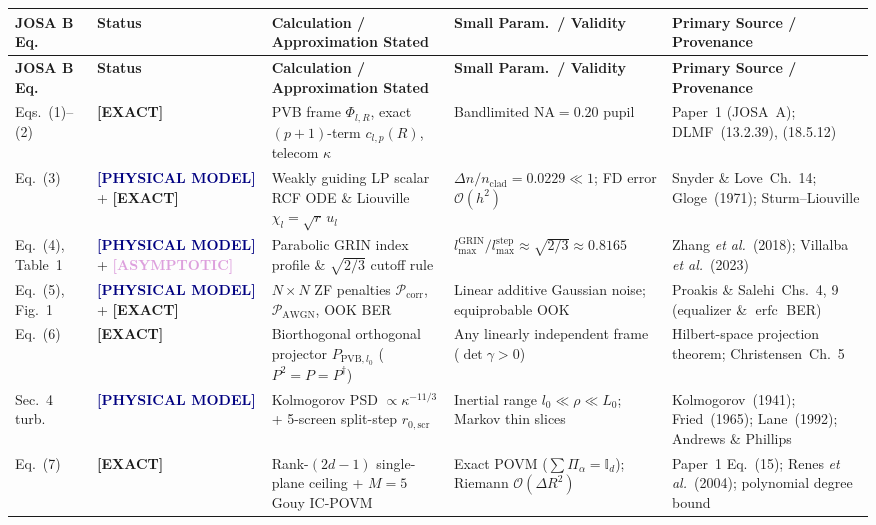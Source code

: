 \documentclass[10pt,letterpaper]{article}
\newcommand{\tagexact}{\textcolor{forest}{\textbf{[EXACT]}}}
\newcommand{\tagmodel}{\textcolor{navy}{\textbf{[PHYSICAL MODEL]}}}
\newcommand{\tagasymp}{\textcolor{plum}{\textbf{[ASYMPTOTIC]}}}
\numberwithin{equation}{section}
\begin{document}
\begin{center}
\scriptsize
\renewcommand{\arraystretch}{1.18}
\setlength{\tabcolsep}{3.5pt}
\begin{longtable}{@{}p{1.5cm}p{2.05cm}p{4.3cm}p{3.6cm}p{4.1cm}@{}}
\toprule
\textbf{JOSA B Eq.} & \textbf{Status} & \textbf{Calculation / Approximation Stated} & \textbf{Small Param.\ / Validity} & \textbf{Primary Source / Provenance} \\
\midrule
\endfirsthead
\toprule
\textbf{JOSA B Eq.} & \textbf{Status} & \textbf{Calculation / Approximation Stated} & \textbf{Small Param.\ / Validity} & \textbf{Primary Source / Provenance} \\
\midrule
\endhead
\bottomrule
\endfoot
Eqs.~(1)--(2) & \tagexact{} & PVB frame $\Phi_{l,R}$, exact $(p+1)$-term $c_{l,p}(R)$, telecom $\kappa$ & Bandlimited $\mathrm{NA} = 0.20$ pupil & Paper~1 (JOSA~A); DLMF~(13.2.39), (18.5.12) \\
Eq.~(3) & \tagmodel{} + \tagexact{} & Weakly guiding LP scalar RCF ODE \& Liouville $\chi_l = \sqrt{r}\,u_l$ & $\Delta n/n_{\mathrm{clad}} = 0.0229 \ll 1$; FD error $\mathcal{O}(h^2)$ & Snyder \& Love~Ch.~14; Gloge~(1971); Sturm--Liouville \\
Eq.~(4), Table~1 & \tagmodel{} + \tagasymp{} & Parabolic GRIN index profile \& $\sqrt{2/3}$ cutoff rule & $l_{\max}^{\mathrm{GRIN}}/l_{\max}^{\mathrm{step}} \approx \sqrt{2/3} \approx 0.8165$ & Zhang \emph{et al.}~(2018); Villalba \emph{et al.}~(2023) \\
Eq.~(5), Fig.~1 & \tagmodel{} + \tagexact{} & $N\times N$ ZF penalties $\mathcal{P}_{\mathrm{corr}}$, $\mathcal{P}_{\mathrm{AWGN}}$, OOK BER & Linear additive Gaussian noise; equiprobable OOK & Proakis \& Salehi~Chs.~4, 9 (equalizer \& $\operatorname{erfc}$ BER) \\
Eq.~(6) & \tagexact{} & Biorthogonal orthogonal projector $P_{\mathrm{PVB},l_0}$ ($P^2=P=P^\dagger$) & Any linearly independent frame ($\det\gamma > 0$) & Hilbert-space projection theorem; Christensen~Ch.~5 \\
Sec.~4 turb. & \tagmodel{} & Kolmogorov PSD $\propto \kappa^{-11/3}$ + 5-screen split-step $r_{0,\mathrm{scr}}$ & Inertial range $l_0 \ll \rho \ll L_0$; Markov thin slices & Kolmogorov~(1941); Fried~(1965); Lane~(1992); Andrews \& Phillips \\
Eq.~(7) & \tagexact{} & Rank-$(2d-1)$ single-plane ceiling + $M=5$ Gouy IC-POVM & Exact POVM ($\sum\Pi_\alpha = \mathbb{I}_d$); Riemann $\mathcal{O}(\Delta R^2)$ & Paper~1 Eq.~(15); Renes \emph{et al.}~(2004); polynomial degree bound \\

\end{longtable}
\end{center}
\end{document}
